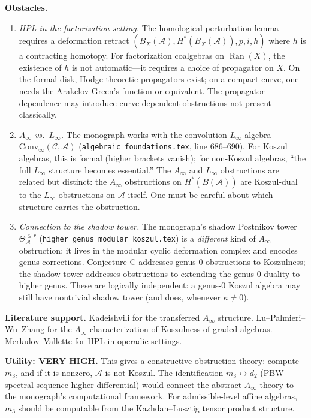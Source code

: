 \documentclass[11pt]{article}
\theoremstyle{remark}
\newcommand{\cA}{\mathcal{A}}
\newcommand{\cC}{\mathcal{C}}
\newcommand{\barB}{\bar{B}}
\newcommand{\Ran}{\operatorname{Ran}}
\begin{document}
\textbf{Obstacles.}
\begin{enumerate}[label=(C\arabic*)]
\item \emph{HPL in the factorization setting.}  The homological perturbation lemma requires a deformation retract $(\barB_X(\cA), H^*(\barB_X(\cA)), p, i, h)$ where $h$ is a contracting homotopy.  For factorization coalgebras on $\Ran(X)$, the existence of $h$ is not automatic---it requires a choice of propagator on $X$.  On the formal disk, Hodge-theoretic propagators exist; on a compact curve, one needs the Arakelov Green's function or equivalent.  The propagator dependence may introduce curve-dependent obstructions not present classically.

\item \emph{$A_\infty$ vs.\ $L_\infty$.}  The monograph works with the convolution $L_\infty$-algebra $\mathrm{Conv}_\infty(\cC, \cA)$ (\texttt{algebraic\_foundations.tex}, line 686--690).  For Koszul algebras, this is formal (higher brackets vanish); for non-Koszul algebras, ``the full $L_\infty$ structure becomes essential.''  The $A_\infty$ and $L_\infty$ obstructions are related but distinct: the $A_\infty$ obstructions on $H^*(\barB(\cA))$ are Koszul-dual to the $L_\infty$ obstructions on $\cA$ itself.  One must be careful about which structure carries the obstruction.

\item \emph{Connection to the shadow tower.}  The monograph's shadow Postnikov tower $\Theta_\cA^{\leq r}$ (\texttt{higher\_genus\_modular\_koszul.tex}) is a \emph{different} kind of $A_\infty$ obstruction: it lives in the modular cyclic deformation complex and encodes genus corrections.  Conjecture C addresses genus-0 obstructions to Koszulness; the shadow tower addresses obstructions to extending the genus-0 duality to higher genus.  These are logically independent: a genus-0 Koszul algebra may still have nontrivial shadow tower (and does, whenever $\kappa \neq 0$).
\end{enumerate}

\textbf{Literature support.}  Kadeishvili \cite{Kad82} for the transferred $A_\infty$ structure.  Lu--Palmieri--Wu--Zhang \cite{LPWZ09} for the $A_\infty$ characterization of Koszulness of graded algebras.  Merkulov--Vallette for HPL in operadic settings.

\textbf{Utility: VERY HIGH.}  This gives a constructive obstruction theory: compute $m_3$, and if it is nonzero, $\cA$ is not Koszul.  The identification $m_3 \leftrightarrow d_2$ (PBW spectral sequence higher differential) would connect the abstract $A_\infty$ theory to the monograph's computational framework.  For admissible-level affine algebras, $m_3$ should be computable from the Kazhdan--Lusztig tensor product structure.
\end{document}
